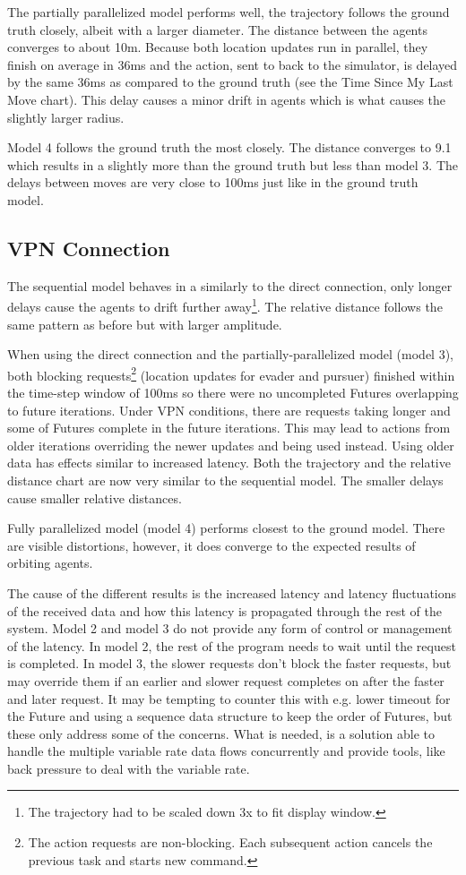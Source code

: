 \documentclass{article}
\begin{document}
The partially parallelized model performs well, the trajectory follows the ground truth closely, albeit with a larger diameter. The distance between the agents converges to about 10m. Because both location updates run in parallel, they finish on average in 36ms and the action, sent to back to the simulator, is delayed by the same 36ms as compared to the ground truth (see the Time Since My Last Move chart). This delay causes a minor drift in agents which is what causes the slightly larger radius.

Model 4 follows the ground truth the most closely. The distance converges to 9.1 which results in a slightly more than the ground truth but less than model 3. The delays between moves are very close to 100ms just like in the ground truth model.


\subsection{VPN Connection} 
The sequential model behaves in a similarly to the direct connection, only longer delays cause the agents to drift further away\footnote{The trajectory had to be scaled down 3x to fit display window.}. The relative distance follows the same pattern as before but with larger amplitude. 

When using the direct connection and the partially-parallelized model (model 3), both blocking requests\footnote{The action requests are non-blocking. Each subsequent action cancels the previous task and starts new command.} (location updates for evader and pursuer) finished within the time-step window of 100ms so there were no uncompleted Futures overlapping to future iterations. Under VPN conditions, there are requests taking longer and some of Futures complete in the future iterations. This may lead to actions from older iterations overriding the newer updates and being used instead. Using older data has effects similar to increased latency. Both the trajectory and the relative distance chart are now very similar to the sequential model. The smaller delays cause smaller relative distances.

Fully parallelized model (model 4) performs closest to the ground model. There are visible distortions, however, it does converge to the expected results of orbiting agents.

The cause of the different results is the increased latency and latency fluctuations of the received data and how this latency is propagated through the rest of the system. Model 2 and model 3 do not provide any form of control or management of the latency. In model 2, the rest of the program needs to wait until the request is completed. In model 3, the slower requests don't block the faster requests, but may override them if an earlier and slower request completes on after the faster and later request. It may be tempting to counter this with e.g. lower timeout for the Future and using a sequence data structure to keep the order of Futures, but these only address some of the concerns. What is needed, is a solution able to handle the multiple variable rate data flows concurrently and provide tools, like back pressure to deal with the variable rate.
\end{document}
